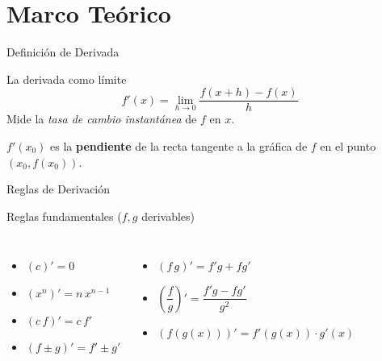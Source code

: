 \documentclass[aspectratio=169]{beamer}
\begin{document}
\begin{frame}[plain]
  \titlepage
\end{frame}

\section{Marco Teórico}

\begin{frame}{Definición de Derivada}
  \begin{block}{La derivada como límite}
    \[
      f'(x) = \lim_{h \to 0}\frac{f(x+h) - f(x)}{h}
    \]
    Mide la \emph{tasa de cambio instantánea} de $f$ en $x$.
  \end{block}
  \vspace{6pt}
  \begin{mwextra}
    $f'(x_0)$ es la \textbf{pendiente} de la recta tangente a la gráfica de $f$ en el punto $(x_0, f(x_0))$.
  \end{mwextra}
\end{frame}

\begin{frame}{Reglas de Derivación}
  \begin{block}{Reglas fundamentales ($f,g$ derivables)}
    \begin{columns}[T]
      \begin{itemize}
        \item $(c)' = 0$
        \item $(x^n)' = n\,x^{n-1}$
        \item $(c\,f)' = c\,f'$
        \item $(f \pm g)' = f' \pm g'$
      \end{itemize}
      \begin{itemize}
        \item $(f\,g)' = f'g + fg'$
        \item $\left(\dfrac{f}{g}\right)' = \dfrac{f'g - fg'}{g^2}$
        \item $(f(g(x)))' = f'(g(x))\cdot g'(x)$
      \end{itemize}
    \end{columns}
  \end{block}
\end{frame}
\end{document}
